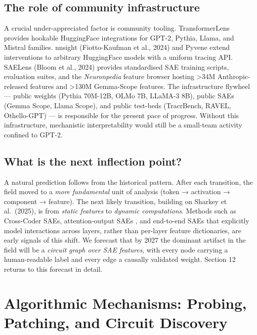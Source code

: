 \documentclass{article}
\begin{document}
\subsection{The role of community infrastructure}\label{the-role-of-community-infrastructure}

A crucial under-appreciated factor is community tooling. TransformerLens \citep{nanda2023progressmeasuresfo} provides hookable HuggingFace integrations for GPT-2, Pythia, Llama, and Mistral families. nnsight (Fiotto-Kaufman et al., 2024) and Pyvene \citep{wu2024fromlanguagemodeli} extend interventions to arbitrary HuggingFace models with a uniform tracing API. SAELens (Bloom et al., 2024) provides standardised SAE training scripts, evaluation suites, and the \emph{Neuronpedia} feature browser hosting \textgreater34M Anthropic-released features and \textgreater130M Gemma-Scope features. The infrastructure flywheel --- public weights (Pythia 70M-12B, OLMo 7B, LLaMA-3 8B), public SAEs (Gemma Scope, Llama Scope), and public test-beds (TracrBench, RAVEL, Othello-GPT) --- is responsible for the present pace of progress. Without this infrastructure, mechanistic interpretability would still be a small-team activity confined to GPT-2.

\subsection{What is the next inflection point?}\label{what-is-the-next-inflection-point}

A natural prediction follows from the historical pattern. After each transition, the field moved to a \emph{more fundamental} unit of analysis (token → activation → component → feature). The next likely transition, building on Sharkey et al.~(2025), is from \emph{static features} to \emph{dynamic computations}. Methods such as Cross-Coder SAEs, attention-output SAEs \citep{kissane2024interpretingattent}, and end-to-end SAEs \citep{braun2024identifyingfunctio} that explicitly model interactions across layers, rather than per-layer feature dictionaries, are early signals of this shift. We forecast that by 2027 the dominant artifact in the field will be a \emph{circuit graph over SAE features}, with every node carrying a human-readable label and every edge a causally validated weight. Section 12 returns to this forecast in detail.

\section{Algorithmic Mechanisms: Probing, Patching, and Circuit Discovery}\label{algorithmic-mechanisms-probing-patching-and-circuit-discovery}
\end{document}
